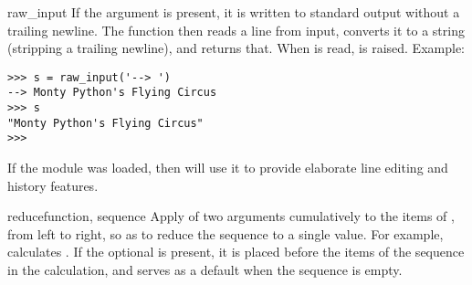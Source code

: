 \begin{funcdesc}{raw_input}{}
  If the  argument is present, it is written to standard output
  without a trailing newline.  The function then reads a line from input,
  converts it to a string (stripping a trailing newline), and returns that.
  When \EOF{} is read,  is raised. Example:

\begin{verbatim}
>>> s = raw_input('--> ')
--> Monty Python's Flying Circus
>>> s
"Monty Python's Flying Circus"
>>> 
\end{verbatim}

If the  module was loaded, then
 will use it to provide elaborate
line editing and history features.
\end{funcdesc}

\begin{funcdesc}{reduce}{function, sequence}
Apply  of two arguments cumulatively to the items of
, from left to right, so as to reduce the sequence to
a single value.  For example,
 calculates
.
If the optional  is present, it is placed before the
items of the sequence in the calculation, and serves as a default when
the sequence is empty.
\end{funcdesc}

